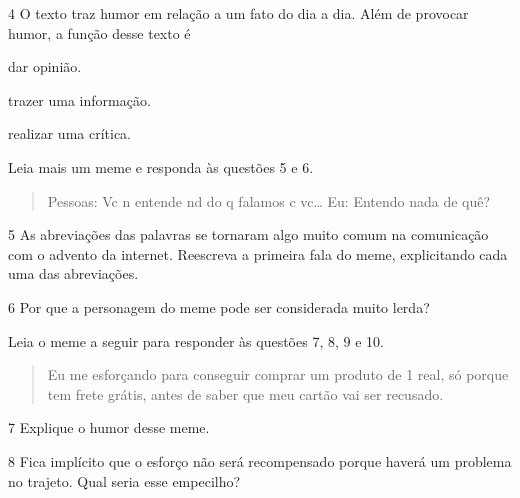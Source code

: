 \num{4} O texto traz humor em relação a um fato do dia a dia. Além de provocar humor, a função desse texto é

\begin{boxlist}
 dar opinião.

 trazer uma informação.

 realizar uma crítica.
\end{boxlist}

Leia mais um meme e responda às questões 5 e 6.


\begin{quote}
Pessoas: Vc n entende nd do q falamos c vc\ldots{} Eu: Entendo nada de quê?
\end{quote}

\num{5} As abreviações das palavras se tornaram algo muito comum na
  comunicação com o advento da internet. Reescreva a primeira fala do
  meme, explicitando cada uma das abreviações.


\num{6} Por que a personagem do meme pode ser considerada muito lerda?


Leia o meme a seguir para responder às questões 7, 8, 9 e 10.


\begin{quote}
Eu me esforçando para conseguir comprar um produto de 1 real, só porque
tem frete grátis, antes de saber que meu cartão vai ser recusado.
\end{quote}

\num{7} Explique o humor desse meme.


\num{8} Fica implícito que o esforço não será recompensado porque haverá um
  problema no trajeto. Qual seria esse empecilho?

